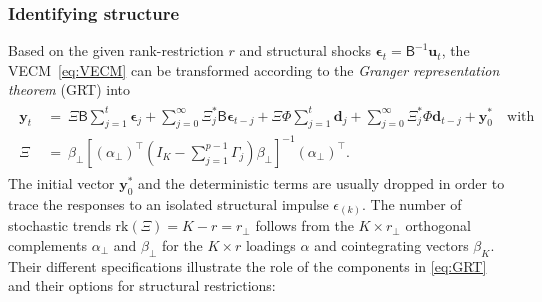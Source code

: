 \subsubsection{Identifying structure}
Based on the given rank-restriction $ r $ and structural shocks $ \boldsymbol{\epsilon}_{t} = \mathsf{B}^{-1} \boldsymbol{u}_{t} $, the VECM~\eqref{eq:VECM} can be transformed according to the \textit{Granger representation theorem} (GRT) into
\begin{align} \label{eq:GRT}
\begin{split}
	\boldsymbol{y}_{t} \ & = \ \Xi \mathsf{B} \sum_{j=1}^{t} \boldsymbol{\epsilon}_{j} + \sum_{j=0}^{\infty} \Xi^{*}_{j} \mathsf{B} \boldsymbol{\epsilon}_{t-j} + \Xi \Phi \sum_{j=1}^{t} \boldsymbol{d}_{j} + \sum_{j=0}^{\infty} \Xi^{*}_{j} \Phi \boldsymbol{d}_{t-j} + \boldsymbol{y}^{*}_{0} \quad \text{with} \\
	\Xi \ & = \ \beta_{\perp} \left[ \left( \alpha_{\perp} \right)^\top \left(I_K - \sum_{j=1}^{p-1} \Gamma_{j} \right) \beta_{\perp} \right]^{-1} \left( \alpha_{\perp} \right)^\top.
\end{split}
\end{align}
The initial vector $ \boldsymbol{y}^{*}_{0} $ and the deterministic terms are usually dropped in order to trace the responses to an isolated structural impulse $ \epsilon_{(k)} $. The number of stochastic trends $\text{rk}(\Xi) = K-r = r_\perp $ follows from the $ K \times r_\perp $ orthogonal complements $ \alpha_{\perp} $ and $ \beta_{\perp} $ for the $ K \times r $ loadings $ \alpha $ and cointegrating vectors $ \beta_K $. Their different specifications illustrate the role of the components in \eqref{eq:GRT} and their options for structural restrictions:
